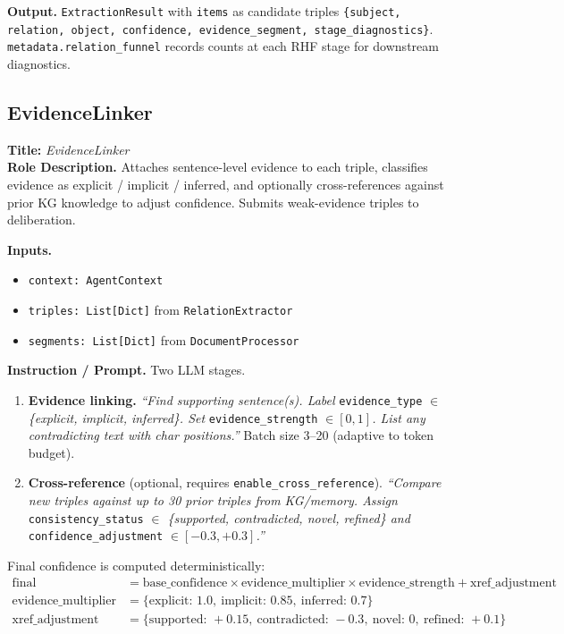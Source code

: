 \documentclass{article}
\begin{document}
\begin{agentbox}
\textbf{Output.} \texttt{ExtractionResult} with \texttt{items} as candidate triples \texttt{\{subject, relation, object, confidence, evidence\_segment, stage\_diagnostics\}}. \texttt{metadata.relation\_funnel} records counts at each RHF stage for downstream diagnostics.
\end{agentbox}

\newpage
\subsection{EvidenceLinker}
\label{app:evidence_linker}

\begin{agentbox}
\textbf{Title:} \textit{EvidenceLinker}\\
\textbf{Role Description.} Attaches sentence-level evidence to each
triple, classifies evidence as explicit / implicit / inferred, and
optionally cross-references against prior KG knowledge to adjust
confidence. Submits weak-evidence triples to deliberation.

\textbf{Inputs.}
\begin{itemize}[leftmargin=*,nosep]
\item \texttt{context: AgentContext}
\item \texttt{triples: List[Dict]} from \texttt{RelationExtractor}
\item \texttt{segments: List[Dict]} from \texttt{DocumentProcessor}
\end{itemize}

\textbf{Instruction / Prompt.} Two LLM stages.
\begin{enumerate}[leftmargin=*,nosep]
\item \textbf{Evidence linking.} \textit{``Find supporting sentence(s). Label} \texttt{evidence\_type} \textit{$\in$ \{explicit, implicit, inferred\}. Set} \texttt{evidence\_strength} \textit{$\in [0,1]$. List any contradicting text with char positions.''} Batch size 3--20 (adaptive to token budget).
\item \textbf{Cross-reference} (optional, requires \texttt{enable\_cross\_reference}). \textit{``Compare new triples against up to 30 prior triples from KG/memory. Assign} \texttt{consistency\_status} \textit{$\in$ \{supported, contradicted, novel, refined\} and} \texttt{confidence\_adjustment} \textit{$\in [-0.3, +0.3]$.''}
\end{enumerate}
Final confidence is computed deterministically:
\begin{align*}
\text{final} &= \text{base\_confidence} \times \text{evidence\_multiplier} \times \text{evidence\_strength} + \text{xref\_adjustment} \\
\text{evidence\_multiplier} &= \{\text{explicit}{:}\,1.0,\ \text{implicit}{:}\,0.85,\ \text{inferred}{:}\,0.7\} \\
\text{xref\_adjustment} &= \{\text{supported}{:}\,{+}0.15,\ \text{contradicted}{:}\,{-}0.3,\ \text{novel}{:}\,0,\ \text{refined}{:}\,{+}0.1\}
\end{align*}


\end{agentbox}
\end{document}
